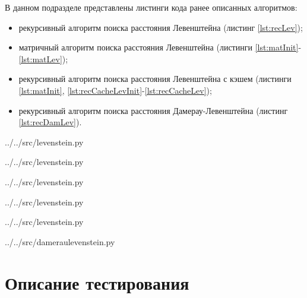 В данном подразделе представлены листинги кода ранее описанных алгоритмов:
\begin{itemize}[left=\parindent]
    \item рекурсивный алгоритм поиска расстояния Левенштейна (листинг
          \ref{lst:recLev});
    \item матричный алгоритм поиска расстояния Левенштейна (листинги
          \ref{lst:matInit}-\ref{lst:matLev});
    \item рекурсивный алгоритм поиска расстояния Левенштейна с кэшем (листинги
          \ref{lst:matInit}, \ref{lst:recCacheLevInit}-\ref{lst:recCacheLev});
    \item рекурсивный алгоритм поиска расстояния Дамерау-Левенштейна (листинг
          \ref{lst:recDamLev}).
\end{itemize}

\begin{lstinputlisting}[
	caption={Реализация рекурсивного алгоритма поиска расстояния Левенштейна},
	label={lst:recLev},
	linerange={20-35}
]{../../src/levenstein.py}
\end{lstinputlisting}

\begin{lstinputlisting}[
	caption={Реализация инициализации матрицы},
	label={lst:matInit},
	linerange={3-7}
]{../../src/levenstein.py}
\end{lstinputlisting}

\begin{lstinputlisting}[
	caption={Реализация матричного алгоритма поиска расстояния Левенштейна},
	label={lst:matLev},
	linerange={38-52}
]{../../src/levenstein.py}
\end{lstinputlisting}

\begin{lstinputlisting}[
    caption={Реализация инициализации данных для рекурсивного алгоритма поиска
             расстояния Левенштейна с кэшем},
	label={lst:recCacheLevInit},
	linerange={77-82}
]{../../src/levenstein.py}
\end{lstinputlisting}

\begin{lstinputlisting}[
	caption={Реализация рекурсивного алгоритма поиска расстояния Левенштейна с кэшем},
	label={lst:recCacheLev},
	linerange={55-74}
]{../../src/levenstein.py}
\end{lstinputlisting}

\begin{lstinputlisting}[
	caption={Реализация рекурсивного алгоритма поиска расстояния Дамерау-Левенштейна},
	label={lst:recDamLev},
	linerange={1-24}
]{../../src/dameraulevenstein.py}
\end{lstinputlisting}

\section{Описание тестирования}
